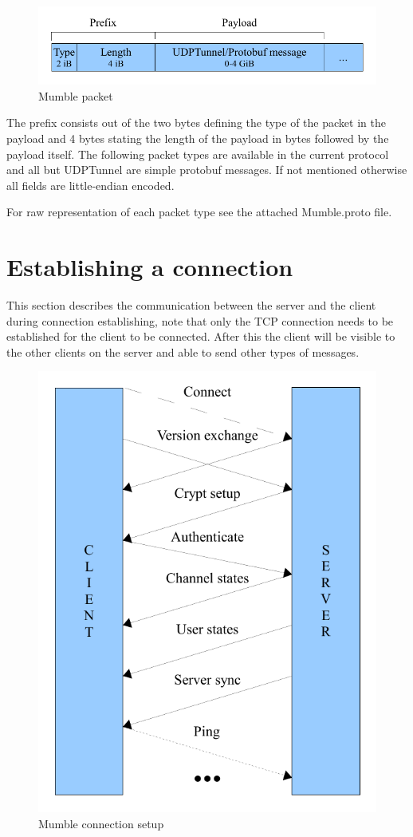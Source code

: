 \documentclass[11pt]{article} %
\begin{document}
\begin{figure}[ht]
	\centering
	\includegraphics[width=0.8\linewidth]{resources/mumble_packet}
	\caption{Mumble packet}
	\label{fig:mumble_packet}
\end{figure}

The prefix consists out of the two bytes defining the type of the packet in the payload and 4 bytes stating the length of the payload in bytes followed by the payload itself. The following packet types are available in the current protocol and all but UDPTunnel are simple protobuf messages. If not mentioned otherwise all fields are little-endian encoded.


For raw representation of each packet type see the attached Mumble.proto file.

\section{Establishing a connection}
This section describes the communication between the server and the client during connection establishing, note that only the TCP connection needs to be established for the client to be connected. After this the client will be visible to the other clients on the server and able to send other types of messages.

\begin{figure}[ht]
	\centering
	\includegraphics[width=0.7\linewidth]{resources/mumble_connection_setup}
	\caption{Mumble connection setup}
	\label{fig:mumble_connection_setup}
\end{figure}
\end{document}
